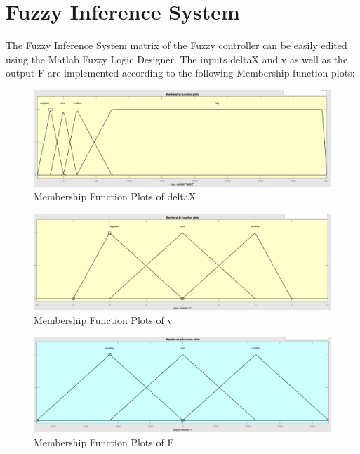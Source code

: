 \section{Fuzzy Inference System}

The Fuzzy Inference System matrix of the Fuzzy controller can be easily edited using the Matlab Fuzzy Logic Designer. The inputs \glqq deltaX\grqq{} and \glqq v\grqq{} as well as the output \glqq F\grqq{} are implemented according to the following Membership function plots:

\begin{figure}[h]
	\centering
	\includegraphics[scale=0.35]{images/mfp_deltax.png}
	\caption{Membership Function Plots of \glqq deltaX\grqq{}}
	\label{lolo}
\end{figure}


\begin{figure}[h]
	\centering
	\includegraphics[scale=0.35]{images/mfp_v.png}
	\caption{Membership Function Plots of \glqq v\grqq{}}
	\label{lele}
\end{figure}


\newpage

\begin{figure}[h]
	\centering
	\includegraphics[scale=0.35]{images/mfp_F.png}
	\caption{Membership Function Plots of \glqq F\grqq{}}
	\label{}
\end{figure}



